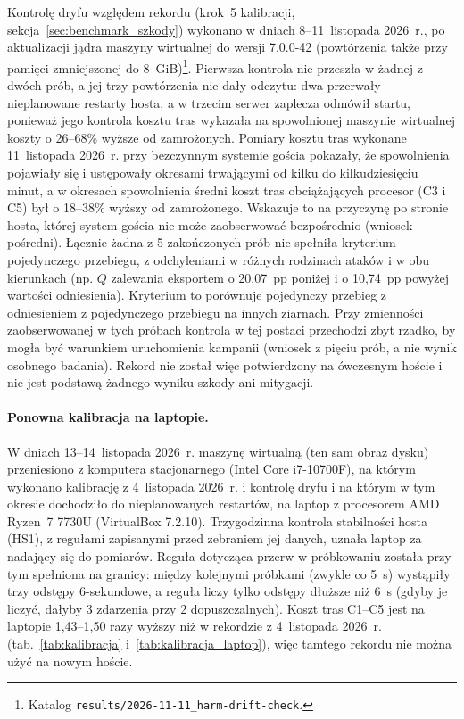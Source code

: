 \documentclass[a4paper,12pt]{article}
\begin{document}
Kontrolę dryfu względem rekordu (krok~5 kalibracji, sekcja~\ref{sec:benchmark_szkody}) wykonano w dniach 8--11~listopada 2026~r., po aktualizacji jądra maszyny wirtualnej do wersji 7.0.0-42 (powtórzenia także przy pamięci zmniejszonej do 8~GiB)\footnote{\raggedright Katalog \texttt{results/2026-11-11\_harm-drift-check}.}. Pierwsza kontrola nie przeszła w żadnej z dwóch prób, a jej trzy powtórzenia nie dały odczytu: dwa przerwały nieplanowane restarty hosta, a w trzecim serwer zaplecza odmówił startu, ponieważ jego kontrola kosztu tras wykazała na spowolnionej maszynie wirtualnej koszty o 26--68\% wyższe od zamrożonych. Pomiary kosztu tras wykonane 11~listopada 2026~r. przy bezczynnym systemie gościa pokazały, że spowolnienia pojawiały się i ustępowały okresami trwającymi od kilku do kilkudziesięciu minut, a w okresach spowolnienia średni koszt tras obciążających procesor (C3 i C5) był o 18--38\% wyższy od zamrożonego. Wskazuje to na przyczynę po stronie hosta, której system gościa nie może zaobserwować bezpośrednio (wniosek pośredni). Łącznie żadna z 5 zakończonych prób nie spełniła kryterium pojedynczego przebiegu, z odchyleniami w różnych rodzinach ataków i w obu kierunkach (np. $Q$ zalewania eksportem o 20,07~pp poniżej i o 10,74~pp powyżej wartości odniesienia). Kryterium to porównuje pojedynczy przebieg z odniesieniem z pojedynczego przebiegu na innych ziarnach. Przy zmienności zaobserwowanej w tych próbach kontrola w tej postaci przechodzi zbyt rzadko, by mogła być warunkiem uruchomienia kampanii (wniosek z pięciu prób, a nie wynik osobnego badania). Rekord nie został więc potwierdzony na ówczesnym hoście i nie jest podstawą żadnego wyniku szkody ani mitygacji.

\paragraph{Ponowna kalibracja na laptopie.} W dniach 13--14~listopada 2026~r. maszynę wirtualną (ten sam obraz dysku) przeniesiono z komputera stacjonarnego (Intel Core i7-10700F), na którym wykonano kalibrację z 4~listopada 2026~r. i kontrolę dryfu i na którym w tym okresie dochodziło do nieplanowanych restartów, na laptop z procesorem AMD Ryzen~7 7730U (VirtualBox 7.2.10). Trzygodzinna kontrola stabilności hosta (HS1), z regułami zapisanymi przed zebraniem jej danych, uznała laptop za nadający się do pomiarów. Reguła dotycząca przerw w próbkowaniu została przy tym spełniona na granicy: między kolejnymi próbkami (zwykle co 5~s) wystąpiły trzy odstępy 6-sekundowe, a reguła liczy tylko odstępy dłuższe niż 6~s (gdyby je liczyć, dałyby 3 zdarzenia przy 2 dopuszczalnych). Koszt tras C1--C5 jest na laptopie 1,43--1,50 razy wyższy niż w rekordzie z 4~listopada 2026~r. (tab.~\ref{tab:kalibracja} i~\ref{tab:kalibracja_laptop}), więc tamtego rekordu nie można użyć na nowym hoście.
\end{document}
